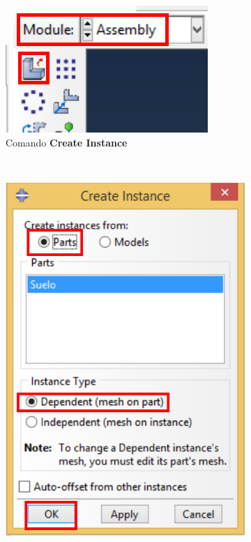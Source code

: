   \begin{figure}
    \centering
    \begin{subfigure}[!h]{0.25\textwidth}
      \includegraphics[width=\textwidth]{./body/images/asse01.pdf}
      \caption{Comando \textbf{Create Instance}}
      \label{asse01}
    \end{subfigure}%
    ~ %
    \begin{subfigure}[!h]{0.39\textwidth}
      \includegraphics[width=\textwidth]{./body/images/asse02.pdf}

\end{subfigure}
\end{figure}
